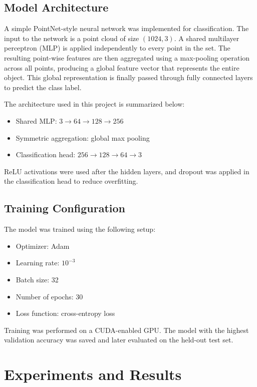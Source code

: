\documentclass[12pt]{article}
\begin{document}
\subsection{Model Architecture}

A simple PointNet-style neural network was implemented for classification. The input to the network is a point cloud of size $(1024, 3)$. A shared multilayer perceptron (MLP) is applied independently to every point in the set. The resulting point-wise features are then aggregated using a max-pooling operation across all points, producing a global feature vector that represents the entire object. This global representation is finally passed through fully connected layers to predict the class label.

The architecture used in this project is summarized below:

\begin{itemize}
    \item Shared MLP: $3 \rightarrow 64 \rightarrow 128 \rightarrow 256$
    \item Symmetric aggregation: global max pooling
    \item Classification head: $256 \rightarrow 128 \rightarrow 64 \rightarrow 3$
\end{itemize}

ReLU activations were used after the hidden layers, and dropout was applied in the classification head to reduce overfitting.

\subsection{Training Configuration}

The model was trained using the following setup:

\begin{itemize}
    \item Optimizer: Adam
    \item Learning rate: $10^{-3}$
    \item Batch size: 32
    \item Number of epochs: 30
    \item Loss function: cross-entropy loss
\end{itemize}

Training was performed on a CUDA-enabled GPU. The model with the highest validation accuracy was saved and later evaluated on the held-out test set.

\section{Experiments and Results}
\end{document}
